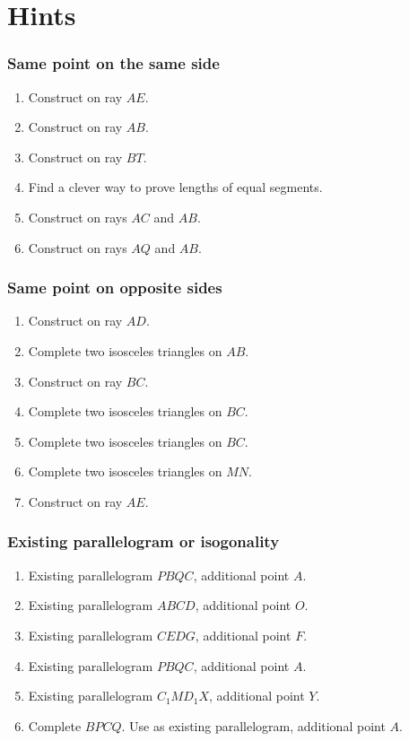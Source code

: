 \documentclass[11pt,paper=letter]{scrartcl}
\begin{document}
\newpage

\section{Hints}


\subsubsection*{Same point on the same side}

\begin{enumerate}
  \item Construct on ray $AE$.
  \item Construct on ray $AB$.
  \item Construct on ray $BT$.
  \item Find a clever way to prove lengths of equal segments.
  \item Construct on rays $AC$ and $AB$.
  \item Construct on rays $AQ$ and $AB$.
\end{enumerate}

\subsubsection*{Same point on opposite sides}

\begin{enumerate}
  \item Construct on ray $AD$.
  \item Complete two isosceles triangles on $AB$.
  \item Construct on ray $BC$.
  \item Complete two isosceles triangles on $BC$.
  \item Complete two isosceles triangles on $BC$.
  \item Complete two isosceles triangles on $MN$.
  \item Construct on ray $AE$.
\end{enumerate}

\subsubsection*{Existing parallelogram or isogonality}

\begin{enumerate}
  \item Existing parallelogram $PBQC$, additional point $A$.
  \item Existing parallelogram $ABCD$, additional point $O$.
  \item Existing parallelogram $CEDG$, additional point $F$.
  \item Existing parallelogram $PBQC$, additional point $A$.
  \item Existing parallelogram $C_1MD_1X$, additional point $Y$.
  \item Complete $BPCQ$. Use as existing parallelogram, additional point $A$.
\end{enumerate}
\end{document}
